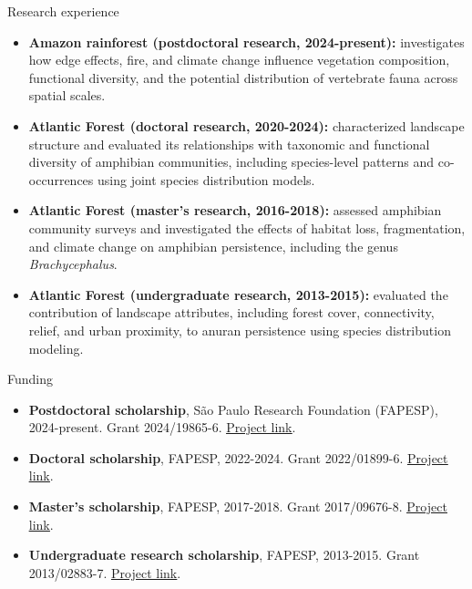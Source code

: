 \documentclass{resume}
\begin{document}
\begin{rSection}{Research experience}
\begin{itemize}
\item \textbf{Amazon rainforest (postdoctoral research, 2024-present):} investigates how edge effects, fire, and climate change influence vegetation composition, functional diversity, and the potential distribution of vertebrate fauna across spatial scales.
\item \textbf{Atlantic Forest (doctoral research, 2020-2024):} characterized landscape structure and evaluated its relationships with taxonomic and functional diversity of amphibian communities, including species-level patterns and co-occurrences using joint species distribution models.
\item \textbf{Atlantic Forest (master's research, 2016-2018):} assessed amphibian community surveys and investigated the effects of habitat loss, fragmentation, and climate change on amphibian persistence, including the genus \textit{Brachycephalus}.
\item \textbf{Atlantic Forest (undergraduate research, 2013-2015):} evaluated the contribution of landscape attributes, including forest cover, connectivity, relief, and urban proximity, to anuran persistence using species distribution modeling.
\end{itemize}
\end{rSection}

\begin{rSection}{Funding}
\begin{itemize}
\item \textbf{Postdoctoral scholarship}, São Paulo Research Foundation (FAPESP), 2024-present. Grant 2024/19865-6. \href{https://bv.fapesp.br/en/bolsas/223203/impacts-of-edge-effects-fire-and-climate-change-on-vegetation-composition-and-functional-diversity-a/}{\underline{Project link}}.
\item \textbf{Doctoral scholarship}, FAPESP, 2022-2024. Grant 2022/01899-6. \href{https://bv.fapesp.br/en/bolsas/203713/landscape-structure-as-a-predictor-of-taxonomic-and-functional-diversity-of-amphibians-in-the-atlant/}{\underline{Project link}}.
\item \textbf{Master's scholarship}, FAPESP, 2017-2018. Grant 2017/09676-8. \href{https://bv.fapesp.br/en/bolsas/172826/effect-of-landscape-modifications-and-climate-changes-on-the-persistence-of-amphibians-in-the-atlant/}{\underline{Project link}}.
\item \textbf{Undergraduate research scholarship}, FAPESP, 2013-2015. Grant 2013/02883-7. \href{https://bv.fapesp.br/en/bolsas/142421/effect-of-fragmentation-on-the-persistence-of-anuran-amphibians-amphibia-anura-within-the-atlanti/}{\underline{Project link}}.
\end{itemize}
\end{rSection}
\end{document}
